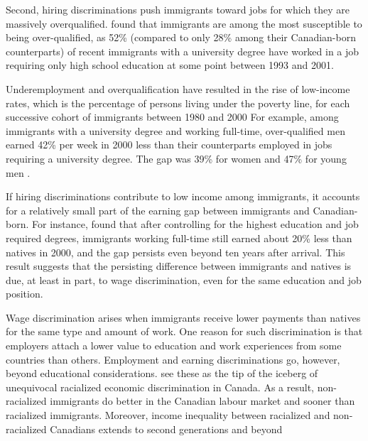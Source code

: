 \vspace{0.7em}\par
Second, hiring discriminations push immigrants toward jobs for which they are massively overqualified.
\citet{Li:2006uu} found that immigrants are among the most susceptible to being over-qualified, as 52\% (compared to only 28\% among their Canadian-born counterparts) of recent immigrants with a university degree have worked in a job requiring only high school education at some point between 1993 and 2001.

\vspace{0.7em}\par
Underemployment and overqualification have resulted in the rise of low-income rates, which is the percentage of persons living under the poverty line, for each successive cohort of immigrants between 1980 and 2000  \citep{picot2003rise}
For example, among immigrants with a university degree and working full-time, over-qualified men earned 42\% per week in 2000 less than their counterparts employed in jobs requiring a university degree.
The gap was 39\% for women and 47\% for young men \citep{Morissette:wh}.

\vspace{0.7em}\par
If hiring discriminations contribute to low income among immigrants, it accounts for a relatively small part of the earning gap between immigrants and Canadian-born.
For instance, \citet{Morissette:wh} found that after controlling for the highest education and job required degrees, immigrants working full-time still earned about 20\% less than natives in 2000, and the gap persists even beyond ten years after arrival.
This result suggests that the persisting difference between immigrants and natives is due, at least in part, to wage discrimination, even for the same education and job position.

\vspace{0.7em}\par
Wage discrimination arises when immigrants receive lower payments than natives for the same type and amount of work.
One reason for such discrimination is that employers attach a lower value to education and work experiences from some countries than others\citep{Coulombe:2014ir,Fortin:2016hl}.
Employment and earning discriminations go, however, beyond educational considerations.
\citet{Block:2019va} see these as the tip of the iceberg of unequivocal racialized economic discrimination in Canada.
As a result, non-racialized immigrants do better in the Canadian labour market and sooner than racialized immigrants.
Moreover, income inequality between racialized and non-racialized Canadians extends to second generations and beyond \citep{Block:2019va,Nadeau:2010jd,Hum:2000gz}

